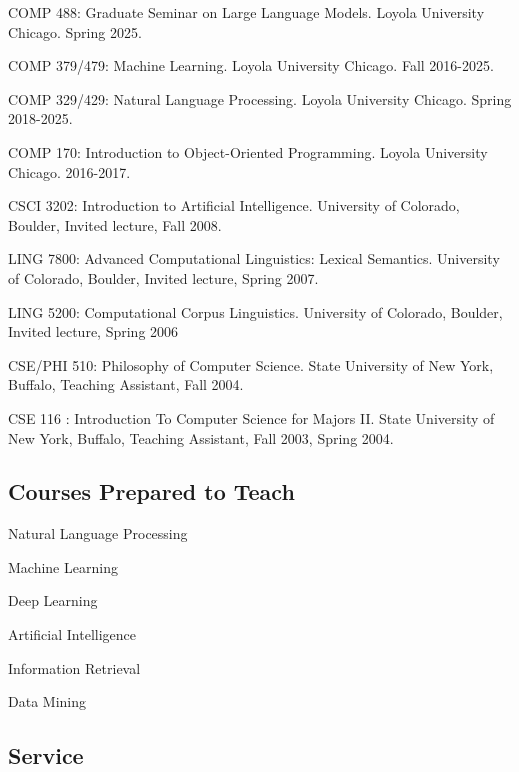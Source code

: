 \documentclass[letterpaper]{article}
\renewenvironment{itemize}{
  \begin{list}{}{
    \setlength{\leftmargin}{1.5em}
  }
}{
  \end{list}
}
\begin{document}
\begin{itemize}
\item COMP 488: Graduate Seminar on Large Language Models. Loyola University Chicago. Spring 2025.
\item COMP 379/479: Machine Learning. Loyola University Chicago. Fall 2016-2025.
\item COMP 329/429: Natural Language Processing. Loyola University Chicago. Spring 2018-2025.
\item COMP 170: Introduction to Object-Oriented Programming. Loyola University Chicago. 2016-2017.
\item CSCI 3202: Introduction to Artificial Intelligence. University of Colorado, Boulder, Invited lecture, Fall 2008.
\item LING 7800: Advanced Computational Linguistics: Lexical Semantics. University of Colorado, Boulder, Invited lecture, Spring 2007.
\item LING 5200: Computational Corpus Linguistics. University of Colorado, Boulder, Invited lecture, Spring 2006
\item CSE/PHI 510: Philosophy of Computer Science. State University of New York, Buffalo, Teaching Assistant, Fall 2004.
\item CSE 116 : Introduction To Computer Science for Majors II. State University of New York, Buffalo, Teaching Assistant, Fall 2003, Spring 2004.
\end{itemize}

\subsection*{Courses Prepared to Teach}

\begin{itemize}
\item Natural Language Processing
\item Machine Learning
\item Deep Learning
\item Artificial Intelligence
\item Information Retrieval
\item Data Mining
\end{itemize}

\subsection*{Service}
\end{document}

